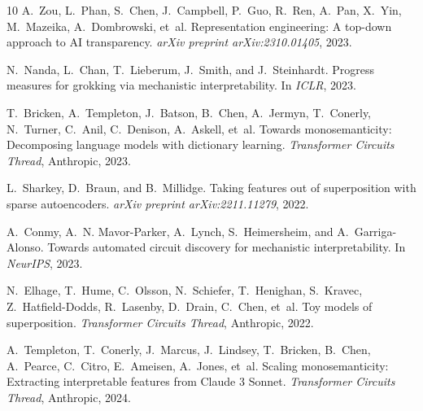 \documentclass[11pt]{article}
\begin{document}
\begin{thebibliography}{10}
A.~Zou, L.~Phan, S.~Chen, J.~Campbell, P.~Guo, R.~Ren, A.~Pan, X.~Yin, M.~Mazeika, A.~Dombrowski, et~al.
\newblock Representation engineering: A top-down approach to {AI} transparency.
\newblock \emph{arXiv preprint arXiv:2310.01405}, 2023.

N.~Nanda, L.~Chan, T.~Lieberum, J.~Smith, and J.~Steinhardt.
\newblock Progress measures for grokking via mechanistic interpretability.
\newblock In \emph{ICLR}, 2023.

T.~Bricken, A.~Templeton, J.~Batson, B.~Chen, A.~Jermyn, T.~Conerly, N.~Turner, C.~Anil, C.~Denison, A.~Askell, et~al.
\newblock Towards monosemanticity: Decomposing language models with dictionary learning.
\newblock \emph{Transformer Circuits Thread}, Anthropic, 2023.

L.~Sharkey, D.~Braun, and B.~Millidge.
\newblock Taking features out of superposition with sparse autoencoders.
\newblock \emph{arXiv preprint arXiv:2211.11279}, 2022.

A.~Conmy, A.~N. Mavor-Parker, A.~Lynch, S.~Heimersheim, and A.~Garriga-Alonso.
\newblock Towards automated circuit discovery for mechanistic interpretability.
\newblock In \emph{NeurIPS}, 2023.

N.~Elhage, T.~Hume, C.~Olsson, N.~Schiefer, T.~Henighan, S.~Kravec, Z.~Hatfield-Dodds, R.~Lasenby, D.~Drain, C.~Chen, et~al.
\newblock Toy models of superposition.
\newblock \emph{Transformer Circuits Thread}, Anthropic, 2022.

A.~Templeton, T.~Conerly, J.~Marcus, J.~Lindsey, T.~Bricken, B.~Chen, A.~Pearce, C.~Citro, E.~Ameisen, A.~Jones, et~al.
\newblock Scaling monosemanticity: Extracting interpretable features from {Claude} 3 {Sonnet}.
\newblock \emph{Transformer Circuits Thread}, Anthropic, 2024.

\end{thebibliography}
\end{document}
